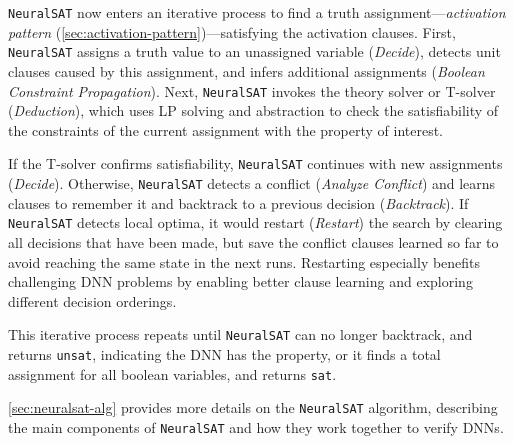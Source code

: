 \documentclass[oneside,11pt,dvipsnames]{book}
\numberwithin{equation}{section}
\theoremstyle{definition}
\theoremstyle{remark}
\newcommand{\neuralsat}{\texttt{NeuralSAT}}
\newcommand{\sat}{\texttt{sat}}
\newcommand{\unsat}{\texttt{unsat}}
\begin{document}
\neuralsat{} now enters an iterative process to find a truth assignment---\emph{activation pattern} (\autoref{sec:activation-pattern})---satisfying the activation clauses.
First, \neuralsat{} assigns a truth value to an unassigned variable (\emph{Decide}), detects unit clauses caused by this assignment, and infers additional assignments (\emph{Boolean Constraint Propagation}).
Next, \neuralsat{} invokes the theory solver or T-solver (\emph{Deduction}), which uses LP solving and abstraction to check the satisfiability of the constraints of the current assignment with the property of interest. %


If the T-solver confirms satisfiability, \neuralsat{} continues with new assignments (\emph{Decide}). Otherwise, \neuralsat{} detects a conflict   (\emph{Analyze Conflict}) and learns clauses to remember it and backtrack to a previous decision  (\emph{Backtrack}).
If \neuralsat{} detects local optima, it would restart (\emph{Restart}) the search by clearing all decisions that have been made, but save the conflict clauses learned so far to avoid reaching the same state in the next runs.
Restarting especially benefits challenging DNN problems by enabling better clause learning and exploring different decision orderings.

This iterative process repeats until \neuralsat{} can no longer backtrack, and returns \unsat{}, indicating the DNN has the property, or it finds a total assignment for all boolean variables, and returns \sat{}. %

\autoref{sec:neuralsat-alg} provides more details on the \neuralsat{} algorithm, describing the main components of \neuralsat{} and how they work together to verify DNNs.
\end{document}
